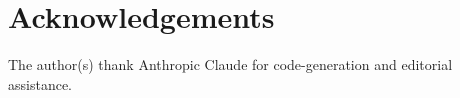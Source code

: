 \documentclass[preprint,12pt]{elsarticle}
\begin{document}
\section*{Acknowledgements}

The author(s) thank Anthropic Claude for code-generation and editorial assistance.
\end{document}
